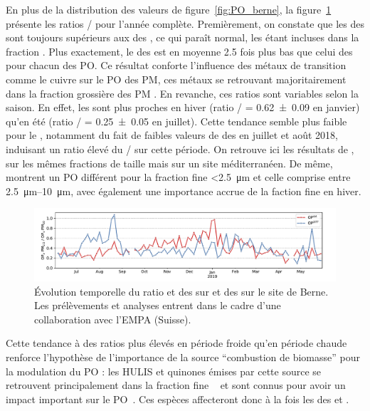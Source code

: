 En plus de la distribution des valeurs de \POv{} figure~\ref{fig:PO_berne}, la
figure~\ref{fig:PO_berne_ratio_PM10_PM25} présente les ratios \POv{} \PMdc/\PMdix{} pour
l'année complète. 
Premièrement, on constate que les \POv{} des \PMdix{} sont toujours supérieurs aux \POv{}
des \PMdc, ce qui paraît normal, les \PMdc{} étant incluses dans la fraction
\PMdix. Plus exactement, le \POv{} des \PMdc{} est en moyenne 2.5 fois plus bas que celui
des \PMdix{} pour chacun des PO. Ce résultat conforte l'influence des métaux de
transition comme le cuivre sur le PO des PM, ces métaux se retrouvant majoritairement
dans la fraction grossière des PM \parencite{harrisonPMF2011,pantCharacterization2017}.
En revanche, ces ratios sont variables selon la saison. En effet, les \POAAv{} sont
plus proches en hiver (ratio \PMdc/\PMdix{} = \num{0.62(9)} en janvier) qu'en été (ratio
\PMdc/\PMdix{} = \num{0.25(5)} en juillet). Cette tendance semble plus faible pour le
\PODTTv, notamment du fait de faibles valeurs de \PODTTv{} des \PMdix{} en juillet et août
2018, induisant un ratio élevé du \PODTTv{} \PMdc/\PMdix{} sur cette période.
On retrouve ici les résultats de \cite{perronePM22019}, sur les mêmes fractions de taille 
mais sur un site méditerranéen. De même, \cite{paraskevopoulouYearlong2019} montrent un PO 
différent pour la fraction fine \SI{<2.5}{\um} et celle comprise entre
\SIrange{2.5}{10}{\um}, avec également une importance accrue de la faction fine en hiver.

\begin{figure}[ht]
    \centering
    \includegraphics[width=1\linewidth]{figures/chapter04/PO_berne_ratio_PM10_PM25.pdf}
    \caption{Évolution temporelle du ratio \POAAv{} et \PODTTv{} des \PMdix{} sur \POAAv{}
    et \PODTTv{} des \PMdc{} sur le site de Berne. Les prélèvements et
analyses entrent dans le cadre d'une collaboration avec l'EMPA (Suisse).}%
    \label{fig:PO_berne_ratio_PM10_PM25}
\end{figure}

Cette tendance à des ratios plus élevés en période froide qu'en période chaude renforce
l'hypothèse de l'importance de la source ``combustion de biomasse'' pour la modulation du
PO : les HULIS et quinones émises par cette source se retrouvent principalement dans la
fraction fine \PMdc{}~\autocite{linAbundance2010,fangOxidative2019} et sont connus pour
avoir un impact important sur le PO~\autocite{vermaFractionating2015,maSources2018}.
Ces espèces affecteront donc à la fois les \POv{} des \PMdc{} et \PMdix.

